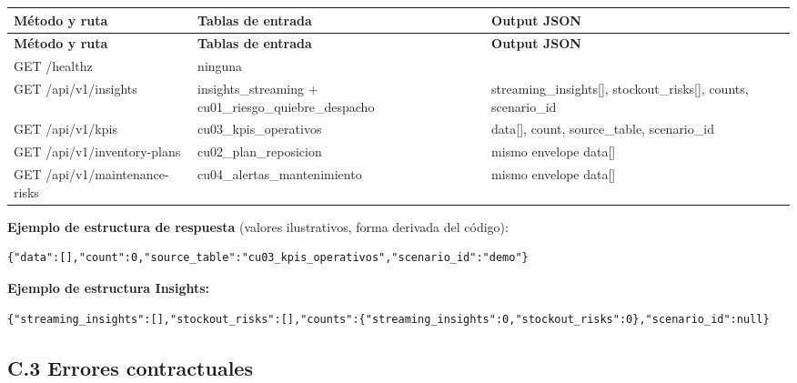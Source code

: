 \documentclass[11pt]{article}
\begin{document}
\begingroup\small
\begin{longtable}{@{}>{\raggedright\arraybackslash}p{}>{\raggedright\arraybackslash}p{}>{\raggedright\arraybackslash}p{}@{}}
\toprule
\textbf{Método y ruta} & \textbf{Tablas de entrada} & \textbf{Output JSON} \\
\midrule
\endfirsthead
\toprule
\textbf{Método y ruta} & \textbf{Tablas de entrada} & \textbf{Output JSON} \\
\midrule
\endhead
GET /healthz & ninguna & [''status'':''ok''] \\
GET /api/\allowbreak{}v1/\allowbreak{}insights & insights\_\allowbreak{}streaming + cu01\_\allowbreak{}riesgo\_\allowbreak{}quiebre\_\allowbreak{}despacho & streaming\_\allowbreak{}insights[], stockout\_\allowbreak{}risks[], counts, scenario\_\allowbreak{}id \\
GET /api/\allowbreak{}v1/\allowbreak{}kpis & cu03\_\allowbreak{}kpis\_\allowbreak{}operativos & data[], count, source\_\allowbreak{}table, scenario\_\allowbreak{}id \\
GET /api/\allowbreak{}v1/\allowbreak{}inventory-plans & cu02\_\allowbreak{}plan\_\allowbreak{}reposicion & mismo envelope data[] \\
GET /api/\allowbreak{}v1/\allowbreak{}maintenance-risks & cu04\_\allowbreak{}alertas\_\allowbreak{}mantenimiento & mismo envelope data[] \\
\bottomrule
\end{longtable}
\endgroup

\textbf{Ejemplo de estructura de respuesta} (valores ilustrativos, forma derivada del código):\par

\begin{lstlisting}
{"data":[],"count":0,"source_table":"cu03_kpis_operativos","scenario_id":"demo"}
\end{lstlisting}

\textbf{Ejemplo de estructura Insights:}\par

\begin{lstlisting}
{"streaming_insights":[],"stockout_risks":[],"counts":{"streaming_insights":0,"stockout_risks":0},"scenario_id":null}
\end{lstlisting}

\subsection{C.3 Errores contractuales}
\end{document}
